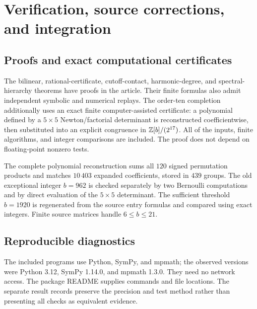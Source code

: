 \section{Verification, source corrections, and integration}
\label{verification:sec}

\subsection{Proofs and exact computational certificates}

The bilinear, rational-certificate, cutoff-contact, harmonic-degree,
and spectral-hierarchy theorems have proofs in the article. Their
finite formulas also admit independent symbolic and numerical
replays. The order-ten completion additionally uses an exact finite
computer-assisted certificate: a polynomial defined by a $5\times5$
Newton/factorial determinant is reconstructed coefficientwise, then
substituted into an explicit congruence in $\mathbb Z[b]/(2^{17})$.
All of the inputs, finite algorithms, and integer comparisons are
included. The proof does not depend on floating-point nonzero tests.

The complete polynomial reconstruction sums all $120$ signed
permutation products and matches $10\,403$ expanded coefficients,
stored in $439$ groups. The old exceptional integer $b=962$ is
checked separately by two Bernoulli computations and by direct
evaluation of the $5\times5$ determinant. The sufficient threshold
$b=1920$ is regenerated from the source entry formulas and compared
using exact integers. Finite source matrices handle $6\le b\le21$.

\subsection{Reproducible diagnostics}

The included programs use Python, SymPy, and mpmath; the observed
versions were Python 3.12, SymPy 1.14.0, and mpmath 1.3.0. They need
no network access. The package README supplies commands and file
locations. The separate result records preserve the precision and
test method rather than presenting all checks as equivalent evidence.

